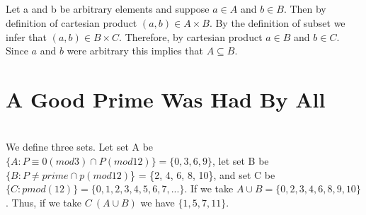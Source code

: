 \documentclass[11pt]{article}
\makeatletter
\renewenvironment{proof}[1][\proofname]{\par
  \normalfont \topsep6\p@\@plus6\p@\relax
  \trivlist
  \item[\hskip\labelsep
        \itshape
    #1\@addpunct{.}]\ignorespaces
}{%
  \endtrivlist\@endpefalse
}
\makeatother
\begin{document}
\subsection{} %
\begin{proof}[\text{Prove:} If $B \nsubseteq \emptyset$ then $A \times B \subseteq B \times C$ then $A \subseteq B$] \leavevmode
	Let a and b be arbitrary elements and suppose $a \in A$ and $b \in B$. Then by definition of cartesian product $(a, b) \in A \times B$. By the definition of subset we infer that $(a, b) \in B \times C$. Therefore, by cartesian product $a \in B$ and $b \in C$. Since $a$ and $b$ were arbitrary this implies that $A \subseteq B$. 
\end{proof}

\section{A Good  Prime Was Had By All} %
\begin{proof}[\text{Prove:} If $p > 2$, p is prime, and $p \not\equiv 0 (mod 3)$ then $p \text{mod} 12 \in {1, 5, 7, 11}$] \leavevmode \\
	We define three sets. Let set A be $\{A : P \equiv 0(mod3) \cap P(mod 12)\} = \{0, 3, 6, 9\}$, let set B be $\{B : P \neq prime \cap p(mod 12)$\} = \{2, 4, 6, 8, 10\}, and set C be $\{C : p mod(12)\} = \{0, 1, 2, 3, 4, 5, 6, 7, ...\}$. If we take $A \cup B = \{0, 2, 3, 4, 6, 8, 9, 10\}$. Thus, if we take $C \ (A \cup B)$ we have $\{1, 5, 7, 11\}$. 
\end{proof}
\end{document}
